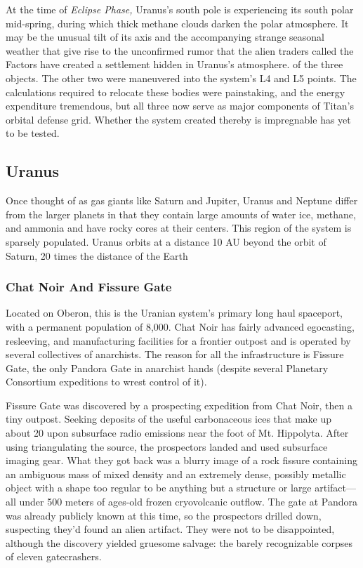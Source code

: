 At the time of \textit{Eclipse Phase,} Uranus's south pole 
is experiencing its south polar mid-spring, during 
which thick methane clouds darken the polar atmosphere. It may be the unusual tilt of its axis and the 
accompanying strange seasonal weather that give 
rise to the unconfirmed rumor that the alien traders 
called the Factors have created a settlement hidden 
in Uranus's atmosphere.
of the three objects. The other two 
were maneuvered into the system's L4
and L5 points. The calculations required
to relocate these  bodies were painstaking, and the energy expenditure tremendous, 
but all three now serve as major components of
Titan's orbital defense grid. Whether the system created thereby is impregnable has yet to be tested.

\subsection{Uranus}

Once thought of as gas giants like Saturn and Jupiter, Uranus and Neptune differ from the larger
planets in that they contain large amounts of water 
ice, methane, and ammonia and have rocky cores at 
their centers. This region of the system is sparsely
populated. Uranus orbits at a distance 10 AU beyond 
the orbit of Saturn, 20 times the distance of the Earth

\subsubsection{Chat Noir And Fissure Gate}

Located on Oberon, this is the Uranian system's primary long haul spaceport, with a permanent population of 8,000. Chat Noir has fairly advanced egocasting, resleeving, and manufacturing facilities for a 
frontier outpost and is operated by several collectives 
of anarchists. The reason for all the infrastructure 
is Fissure Gate, the only Pandora Gate in anarchist 
hands (despite several Planetary Consortium expeditions to wrest control of it).

Fissure Gate was discovered by a prospecting expedition from Chat Noir, then a tiny outpost. Seeking 
deposits of the useful carbonaceous ices that make up 
about 20%
upon subsurface radio emissions near the foot of Mt. 
Hippolyta. After using triangulating the source, the 
prospectors landed and used subsurface imaging gear. 
What they got back was a blurry image of a rock fissure containing an ambiguous mass of mixed density 
and an extremely dense, possibly metallic object with 
a shape too regular to be anything but a structure 
or large artifact—all under 500 meters of ages-old 
frozen cryovolcanic outflow. The gate at Pandora was 
already publicly known at this time, so the prospectors drilled down, suspecting they'd found an alien 
artifact. They were not to be disappointed, although 
the discovery yielded gruesome salvage: the barely 
recognizable corpses of eleven gatecrashers.

